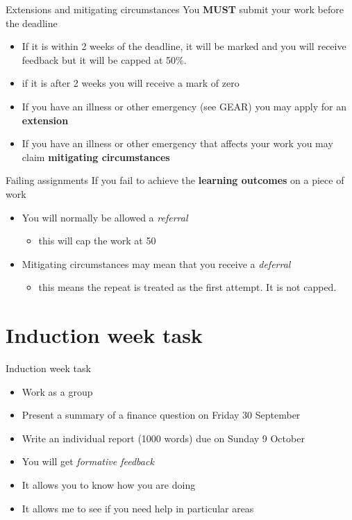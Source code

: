 \documentclass[14pt,xcolor=pdftex,dvipsnames,table]{beamer}\usepackage[]{graphicx}\usepackage[]{color}
\begin{document}
\begin{frame}{Extensions and mitigating circumstances}
You \textbf{MUST} submit your work before the deadline
\begin{itemize}[<+-| alert@+>]
\pause
\item If it is within 2 weeks of the deadline, it will be marked and you will receive feedback but it will be capped at 50\%. 
\item if it is after 2 weeks you will receive a mark of zero
\item If you have an illness or other emergency (see GEAR) you may apply for an \textbf{extension}
\item If you have an illness or other emergency that affects your work you may claim \textbf{mitigating circumstances}
\end{itemize}
\end{frame}

\begin{frame}{Failing assignments}
If you fail to achieve the \textbf{learning outcomes} on a piece of work
\begin{itemize}[<+-| alert@+>]
\pause
\item You will normally be allowed a \emph{referral}
\begin{itemize}
\item this will cap the work at 50
\end{itemize}
\item Mitigating circumstances may mean that you receive a \emph{deferral}
\begin{itemize}
\item this means the repeat is treated as the first attempt.  It is not capped. 
\end{itemize}
\end{itemize}
\end{frame}

\section{Induction week task}
\begin{frame}{Induction week task}
\begin{itemize}[<+-| alert@+>]
\pause
\item Work as a group
\item Present a summary of a finance question on Friday 30 September
\item Write an individual report (1000 words) due on Sunday 9 October
\item You will get \emph{formative feedback}
\item It allows you to know how you are doing
\item It allows me to see if you need help in particular areas
\end{itemize}
\end{frame}
\end{document}
